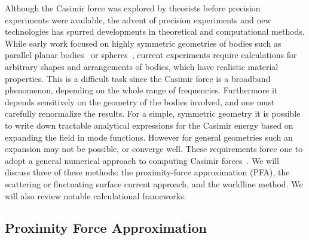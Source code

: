 Although the Casimir force was explored by theorists before precision experiments were available,
the advent of precision experiments and new technologies has spurred developments in 
theoretical and computational methods.
While early work focused on highly symmetric geometries 
of bodies such as parallel planar bodies~\cite{Casimir1948} or spheres~\cite{Boyer1968}, 
current experiments require calculations for arbitrary shapes and arrangements of bodies, 
which have realistic material properties.  
This is a difficult task since the Casimir force is a broadband phenomenon, depending on the whole 
range of frequencies.  Furthermore it depends sensitively on the geometry of the bodies involved, 
and one must carefully renormalize the results.  
For a simple, symmetric geometry it is possible to write down tractable analytical expressions for
the Casimir energy based on expanding the field in mode functions.  However for general geometries 
such an expansion may not be possible, or converge well.
These requirements force one to adopt a general numerical approach to computing Casimir forces~\cite{Johnson2011}.
We will discuss three of these methods: the proximity-force approximation (PFA), the scattering
or fluctuating surface current approach, and the worldline method.  We will also review notable
calculational frameworks.  


\subsection{Proximity Force Approximation}


